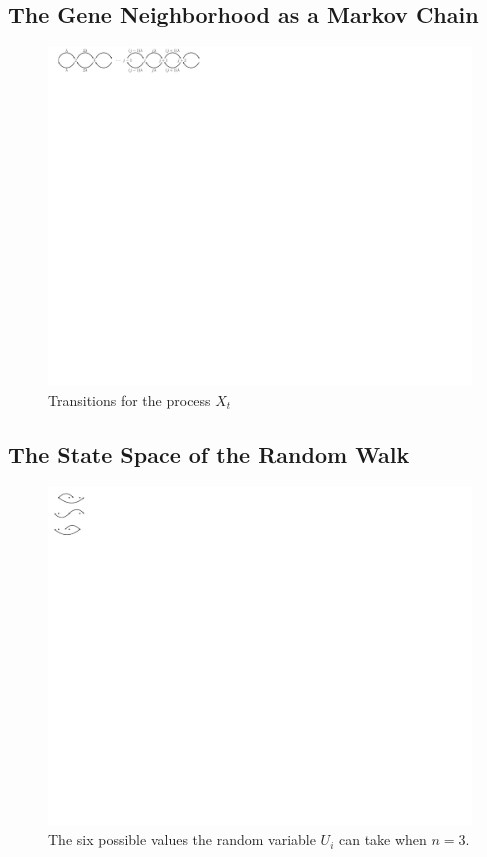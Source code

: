 \documentclass[runningheads, 11pt]{llncs}
\newcommand{\ignore}[1]{}
\begin{document}
\subsection{The Gene Neighborhood as a Markov Chain}
{
\begin{figure}[htb]
\centering
\includegraphics[scale=0.7]{figs/Sagi_fig.pdf}
\caption{Transitions for the process $X_t$}
\label{dpi}
\end{figure}
}%


\subsection{The State Space of the Random Walk}
{
\begin{figure}[htb]
\centering
\includegraphics[scale=0.7]{figs/3_dots.pdf}
\caption{The six possible values the random variable $U_i$ can take when $n=3$.}
\label{3p}
\end{figure}
}
\end{document}
